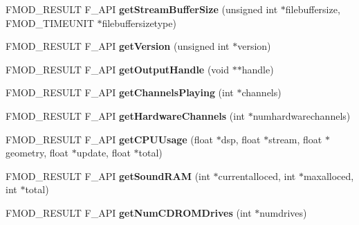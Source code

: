 \begin{DoxyCompactItemize}
\item 
F\+M\+O\+D\+\_\+\+R\+E\+S\+U\+LT F\+\_\+\+A\+PI {\bfseries get\+Stream\+Buffer\+Size} (unsigned int $\ast$filebuffersize, F\+M\+O\+D\+\_\+\+T\+I\+M\+E\+U\+N\+IT $\ast$filebuffersizetype)\hypertarget{class_f_m_o_d_1_1_system_a363f5ab0586dd5a10e091986fc2e6a3f}{}\label{class_f_m_o_d_1_1_system_a363f5ab0586dd5a10e091986fc2e6a3f}

\item 
F\+M\+O\+D\+\_\+\+R\+E\+S\+U\+LT F\+\_\+\+A\+PI {\bfseries get\+Version} (unsigned int $\ast$version)\hypertarget{class_f_m_o_d_1_1_system_ac248a1234309ccb8be4c69f6b1a8d07e}{}\label{class_f_m_o_d_1_1_system_ac248a1234309ccb8be4c69f6b1a8d07e}

\item 
F\+M\+O\+D\+\_\+\+R\+E\+S\+U\+LT F\+\_\+\+A\+PI {\bfseries get\+Output\+Handle} (void $\ast$$\ast$handle)\hypertarget{class_f_m_o_d_1_1_system_a0bd90d8ae95bad9f2cca9658b73da96d}{}\label{class_f_m_o_d_1_1_system_a0bd90d8ae95bad9f2cca9658b73da96d}

\item 
F\+M\+O\+D\+\_\+\+R\+E\+S\+U\+LT F\+\_\+\+A\+PI {\bfseries get\+Channels\+Playing} (int $\ast$channels)\hypertarget{class_f_m_o_d_1_1_system_a5188b4b34e150daf4cc64dde24ad1c1c}{}\label{class_f_m_o_d_1_1_system_a5188b4b34e150daf4cc64dde24ad1c1c}

\item 
F\+M\+O\+D\+\_\+\+R\+E\+S\+U\+LT F\+\_\+\+A\+PI {\bfseries get\+Hardware\+Channels} (int $\ast$numhardwarechannels)\hypertarget{class_f_m_o_d_1_1_system_a25278fabe9e4e95e676e3b56921efa41}{}\label{class_f_m_o_d_1_1_system_a25278fabe9e4e95e676e3b56921efa41}

\item 
F\+M\+O\+D\+\_\+\+R\+E\+S\+U\+LT F\+\_\+\+A\+PI {\bfseries get\+C\+P\+U\+Usage} (float $\ast$dsp, float $\ast$stream, float $\ast$geometry, float $\ast$update, float $\ast$total)\hypertarget{class_f_m_o_d_1_1_system_a3faa4a44c39af4c49f5812bb000c43d4}{}\label{class_f_m_o_d_1_1_system_a3faa4a44c39af4c49f5812bb000c43d4}

\item 
F\+M\+O\+D\+\_\+\+R\+E\+S\+U\+LT F\+\_\+\+A\+PI {\bfseries get\+Sound\+R\+AM} (int $\ast$currentalloced, int $\ast$maxalloced, int $\ast$total)\hypertarget{class_f_m_o_d_1_1_system_a406c76a44c183773616569d2cdec2036}{}\label{class_f_m_o_d_1_1_system_a406c76a44c183773616569d2cdec2036}

\item 
F\+M\+O\+D\+\_\+\+R\+E\+S\+U\+LT F\+\_\+\+A\+PI {\bfseries get\+Num\+C\+D\+R\+O\+M\+Drives} (int $\ast$numdrives)\hypertarget{class_f_m_o_d_1_1_system_a0486b9577e9315bca170478ab27bae2f}{}\label{class_f_m_o_d_1_1_system_a0486b9577e9315bca170478ab27bae2f}


\end{DoxyCompactItemize}
